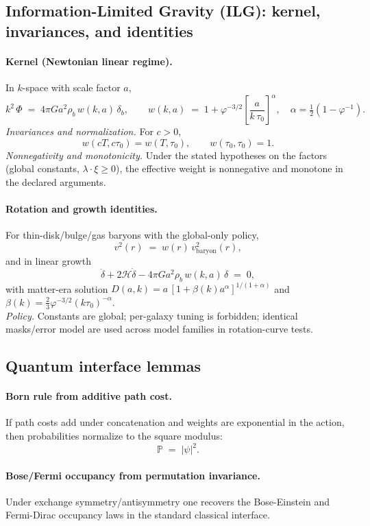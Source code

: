 \documentclass[11pt]{article}
\begin{document}
\subsection{Information-Limited Gravity (ILG): kernel, invariances, and identities}\label{subsec:ILG}

\paragraph{Kernel (Newtonian linear regime).}
In $k$-space with scale factor $a$,
\[
k^2\,\Phi \;=\; 4\pi G a^2 \rho_b\,w(k,a)\,\delta_b,\qquad
w(k,a) \;=\; 1 + \varphi^{-3/2}\!\left[\frac{a}{k\,\tau_0}\right]^{\alpha},
\quad \alpha=\tfrac12\!\left(1-\varphi^{-1}\right).
\]
\emph{Invariances and normalization.} For $c>0$,
\[
w(cT,c\tau_0)=w(T,\tau_0),\qquad w(\tau_0,\tau_0)=1.
\]
\emph{Nonnegativity and monotonicity.} Under the stated hypotheses on the factors (global constants, $\lambda\cdot\xi\ge 0$), the effective weight is nonnegative and monotone in the declared arguments. 

\paragraph{Rotation and growth identities.}
For thin-disk/bulge/gas baryons with the global-only policy,
\[
v^2(r) \;=\; w(r)\,v_{\mathrm{baryon}}^2(r),
\]
and in linear growth
\[
\ddot\delta + 2\mathcal{H}\dot\delta - 4\pi G a^2 \rho_b\,w(k,a)\,\delta \;=\; 0,
\]
with matter-era solution \(D(a,k)=a\,[1+\beta(k)a^{\alpha}]^{1/(1+\alpha)}\) and \(\beta(k)=\tfrac{2}{3}\varphi^{-3/2}(k\tau_0)^{-\alpha}\). \\
\emph{Policy.} Constants are global; per-galaxy tuning is forbidden; identical masks/error model are used across model families in rotation-curve tests. 

\subsection{Quantum interface lemmas}\label{subsec:quantum}

\paragraph{Born rule from additive path cost.}
If path costs add under concatenation and weights are exponential in the action, then probabilities normalize to the square modulus:
\[
\mathbb{P} \;=\; |\psi|^2 .
\]
\paragraph{Bose/Fermi occupancy from permutation invariance.}
Under exchange symmetry/antisymmetry one recovers the Bose-Einstein and Fermi-Dirac occupancy laws in the standard classical interface.
\end{document}
